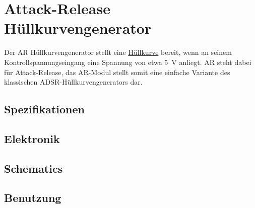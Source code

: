 \documentclass[11pt]{article}
\date{\today}
\title{}
\begin{document}
\tableofcontents

\section{Attack-Release Hüllkurvengenerator}
\label{sec:org0001e10}
Der AR Hüllkurvengenerator stellt eine \href{file:///home/felixp/Documents/diplomarbeit/dokumentation/content/theoretische\_grundlagen.org}{Hüllkurve} bereit, wenn an seinem Kontrollspannungseingang eine Spannung von etwa \SI{5}{\volt} anliegt. AR steht dabei für Attack-Release, das AR-Modul stellt somit eine einfache Variante des klassischen ADSR-Hüllkurvengenerators dar.
\subsection{Spezifikationen}
\label{sec:org10bedb0}
\subsection{Elektronik}
\label{sec:orga44b8a3}
\subsection{Schematics}
\label{sec:org639e78e}
\subsection{Benutzung}
\label{sec:orgd03db95}
\end{document}
